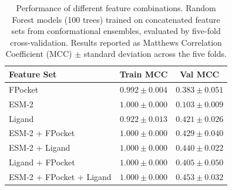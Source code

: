 \begin{table}[h!]
\centering
\begin{tabular}{lcc}
\hline
\textbf{Feature Set} & \textbf{Train MCC} & \textbf{Val MCC} \\
\hline
FPocket                   & $0.992 \pm 0.004$ & $0.383 \pm 0.051$ \\
ESM-2                     & $1.000 \pm 0.000$ & $0.103 \pm 0.009$ \\
Ligand                    & $0.922 \pm 0.013$ & $0.421 \pm 0.026$ \\
ESM-2 + FPocket           & $1.000 \pm 0.000$ & $0.429 \pm 0.040$ \\
ESM-2 + Ligand            & $1.000 \pm 0.000$ & $0.440 \pm 0.022$ \\
Ligand + FPocket          & $1.000 \pm 0.000$ & $0.405 \pm 0.050$ \\
ESM-2 + FPocket + Ligand  & $1.000 \pm 0.000$ & $\mathbf{0.453 \pm 0.032}$ \\
\hline
\end{tabular}
\caption{Performance of different feature combinations. Random Forest models (100 trees) trained on concatenated feature sets from conformational ensembles, evaluated by five-fold cross-validation. Results reported as Matthews Correlation Coefficient (MCC) $\pm$ standard deviation across the five folds.}\label{tab:ablation}
\end{table}
